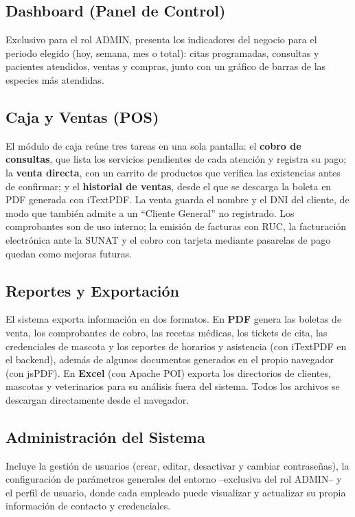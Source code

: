\documentclass[11pt,a4paper]{report}
\begin{document}
\subsection{Dashboard (Panel de Control)}
Exclusivo para el rol ADMIN, presenta los indicadores del negocio para el periodo elegido (hoy, semana, mes o total): citas programadas, consultas y pacientes atendidos, ventas y compras, junto con un gráfico de barras de las especies más atendidas.

\subsection{Caja y Ventas (POS)}
El módulo de caja reúne tres tareas en una sola pantalla: el \textbf{cobro de consultas}, que lista los servicios pendientes de cada atención y registra su pago; la \textbf{venta directa}, con un carrito de productos que verifica las existencias antes de confirmar; y el \textbf{historial de ventas}, desde el que se descarga la boleta en PDF generada con iTextPDF. La venta guarda el nombre y el DNI del cliente, de modo que también admite a un ``Cliente General'' no registrado. Los comprobantes son de uso interno; la emisión de facturas con RUC, la facturación electrónica ante la SUNAT y el cobro con tarjeta mediante pasarelas de pago quedan como mejoras futuras.

\subsection{Reportes y Exportación}
El sistema exporta información en dos formatos. En \textbf{PDF} genera las boletas de venta, los comprobantes de cobro, las recetas médicas, los tickets de cita, las credenciales de mascota y los reportes de horarios y asistencia (con iTextPDF en el backend), además de algunos documentos generados en el propio navegador (con jsPDF). En \textbf{Excel} (con Apache POI) exporta los directorios de clientes, mascotas y veterinarios para su análisis fuera del sistema. Todos los archivos se descargan directamente desde el navegador.

\subsection{Administración del Sistema}
Incluye la gestión de usuarios (crear, editar, desactivar y cambiar contraseñas), la configuración de parámetros generales del entorno --exclusiva del rol ADMIN-- y el perfil de usuario, donde cada empleado puede visualizar y actualizar su propia información de contacto y credenciales.
\end{document}
